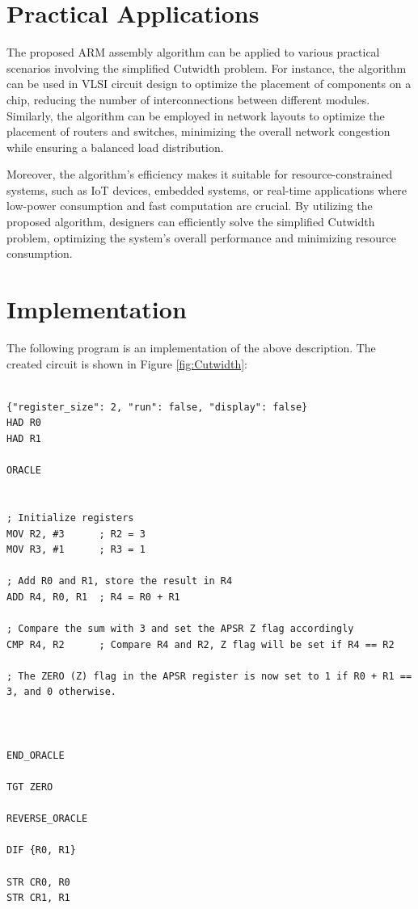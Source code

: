 \section{Practical Applications}

The proposed ARM assembly algorithm can be applied to various practical scenarios involving the simplified Cutwidth problem. For instance, the algorithm can be used in VLSI circuit design to optimize the placement of components on a chip, reducing the number of interconnections between different modules. Similarly, the algorithm can be employed in network layouts to optimize the placement of routers and switches, minimizing the overall network congestion while ensuring a balanced load distribution.

Moreover, the algorithm's efficiency makes it suitable for resource-constrained systems, such as IoT devices, embedded systems, or real-time applications where low-power consumption and fast computation are crucial. By utilizing the proposed algorithm, designers can efficiently solve the simplified Cutwidth problem, optimizing the system's overall performance and minimizing resource consumption.



\section{Implementation}

The following program is an implementation of the above description. The created circuit is shown in Figure \ref{fig:Cutwidth}:

\begin{lstlisting}

{"register_size": 2, "run": false, "display": false}
HAD R0
HAD R1

ORACLE


; Initialize registers
MOV R2, #3      ; R2 = 3
MOV R3, #1      ; R3 = 1

; Add R0 and R1, store the result in R4
ADD R4, R0, R1  ; R4 = R0 + R1

; Compare the sum with 3 and set the APSR Z flag accordingly
CMP R4, R2      ; Compare R4 and R2, Z flag will be set if R4 == R2

; The ZERO (Z) flag in the APSR register is now set to 1 if R0 + R1 == 3, and 0 otherwise.



END_ORACLE

TGT ZERO

REVERSE_ORACLE

DIF {R0, R1}

STR CR0, R0
STR CR1, R1


\end{lstlisting}

